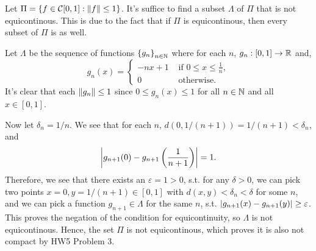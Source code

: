 \documentclass[12pt]{article}
\begin{document}
\begin{fproof}[1(b)]
Let \(\Pi = \left\{ f \in \mathcal{C}[0,1]: \left\lVert f \right\rVert \leq 1 \right\}\).
It's suffice to find a subset \(\Lambda\) of \(\Pi\) that is not equicontinous.
This is due to the fact that if \(\Pi\) is equicontinous, then every subset of \(\Pi\) is as well.

Let \(\Lambda\) be the sequence of functions \(\left\{ g_n \right\}_{n \in \mathbb {N}}\) where for each \(n\), \(g_n:[0,1] \to \mathbb {R}\) and,
\[
    g_n(x) =
\begin{cases}
    -nx + 1 & \text{ if } 0 \leq x \leq \frac{1}{n},\\
    0 & \text{ otherwise}.
\end{cases}
\]
It's clear that each \(\left\lVert g_n \right\rVert \leq 1\) since \(0 \leq g_n(x) \leq 1\) for all \(n \in \mathbb {N}\) and all \(x \in [0,1]\).

Now let \(\delta_n = 1/n\).
We see that for each \(n\),
\(d(0, 1/(n+1)) = 1/(n+1) < \delta_n\), and
\begin{align*}
    \left\lvert g_{n+1}(0) - g_{n+1}\left( \frac{1}{n+1} \right) \right\rvert = 1.
\end{align*}
Therefore, we see that there exists an \(\varepsilon = 1 > 0\), s.t. for any \(\delta > 0\),
we can pick two points \(x=0, y=1/(n+1) \in [0,1]\) with \(d(x, y) < \delta_n < \delta\) for some \(n\), and we can pick a function \(g_{n+1} \in \Lambda\) for the same \(n\), s.t. \(\left\lvert g_{n+1}(x) - g_{n+1}(y) \right\rvert \geq \varepsilon\).
This proves the negation of the condition for equicontinuity, so \(\Lambda\) is not equicontinous. Hence, the set \(\Pi\) is not equicontinous, which proves it is also not compact by HW5 Problem 3.

\end{fproof}
\newpage

\begin{fproof}[2]

\end{fproof}
\newpage

\begin{fproof}[3(a)]
  
\end{fproof}

\begin{fproof}[3(b)]
  
\end{fproof}
\newpage

\begin{fproof}[4]

\end{fproof}
\newpage

\begin{fproof}[5]

\end{fproof}
\end{document}
